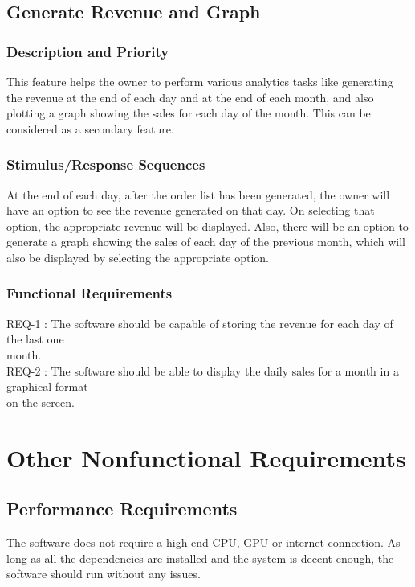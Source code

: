 \documentclass{scrreprt}
\begin{document}
\section{Generate Revenue and Graph}

\subsection{Description and Priority}

This feature helps the owner to perform various analytics tasks like generating the revenue at the end of each day and at the end of each month, and also plotting a graph showing the sales for each day of the month. This can be considered as a secondary feature.

\subsection{Stimulus/Response Sequences}

At the end of each day, after the order list has been generated, the owner will have an option to see the revenue generated on that day. On selecting that option, the appropriate revenue will be displayed. Also, there will be an option to generate a graph showing the sales of each day of the previous month, which will also be displayed by selecting the appropriate option.

\subsection{Functional Requirements}

REQ-1 : The software should be capable of storing the revenue for each day of the last one\\\hspace*{1.5cm} month.\\
REQ-2 : The software should be able to display the daily sales for a month in a graphical format\\\hspace*{1.5cm} on the screen.

\chapter{Other Nonfunctional Requirements}

\section{Performance Requirements}
The software does not require a high-end CPU, GPU or internet connection. As long as all the dependencies are installed and the system is decent enough, the software should run without any issues.
\end{document}
